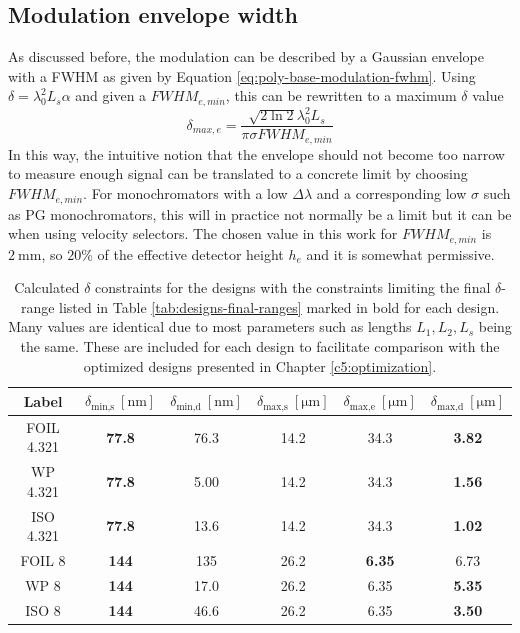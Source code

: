 \subsection{Modulation envelope width}
\label{c4.1.3}
As discussed before, the modulation can be described by a Gaussian envelope with a FWHM as given by Equation \eqref{eq:poly-base-modulation-fwhm}. Using $\delta = \lambda_0^2L_s\alpha$ and given a $FWHM_{e,min}$, this can be rewritten to a maximum $\delta$ value
$$\delta_{max,e} = \frac{\sqrt{2\ln 2}\lambda_0^2 L_s}{\pi\sigma FWHM_{e,min}}$$
In this way, the intuitive notion that the envelope should not become too narrow to measure enough signal can be translated to a concrete limit by choosing $FWHM_{e,min}$. For monochromators with a low $\Delta\lambda$ and a corresponding low $\sigma$ such as PG monochromators, this will in practice not normally be a limit but it can be when using velocity selectors. The chosen value in this work for $FWHM_{e,min}$ is $\SI{2}{\milli\meter}$, so $20$\% of the effective detector height $h_e$ and it is somewhat permissive.  

\begin{table}[h!]
	\centering
	\begin{tabular}{c | c c | c c c}
		\toprule
		Label & $\delta_{\text{min,s}} ~[\unit{\nano\meter}]$ & $\delta_{\text{min,d}} ~[\unit{\nano\meter}]$ & $\delta_{\text{max,s}}~[\unit{\micro\meter}]$& $\delta_{\text{max,e}} ~[\unit{\micro\meter}]$ & $\delta_{\text{max,d}} ~[\unit{\micro\meter}]$ \\
		\midrule
		FOIL 4.321 & \textbf{77.8} & \num{76.3} & \num{14.2} & \num{34.3} & \textbf{3.82} \\
		WP 4.321 & \textbf{77.8} & \num{5.00} & \num{14.2} & \num{34.3} & \textbf{1.56} \\
		ISO 4.321 & \textbf{77.8} & \num{13.6} & \num{14.2} & \num{34.3} & \textbf{1.02} \\
		FOIL 8 & \textbf{144} & \num{135} & \num{26.2} & \textbf{6.35} & \num{6.73} \\
		WP 8 & \textbf{144} & \num{17.0} & \num{26.2} & \num{6.35} & \textbf{5.35} \\
		ISO 8 & \textbf{144} & \num{46.6} & \num{26.2} & \num{6.35} & \textbf{3.50} \\
		\bottomrule
	\end{tabular}
	\caption{Calculated $\delta$ constraints for the designs with the constraints limiting the final $\delta$-range listed in Table \ref{tab:designs-final-ranges} marked in bold for each design. Many values are identical due to most parameters such as lengths $L_1, L_2, L_s$ being the same. These are included for each design to facilitate comparison with the optimized designs presented in Chapter \ref{c5:optimization}.}
	\label{tab:designs-delta-constraints}
\end{table}

